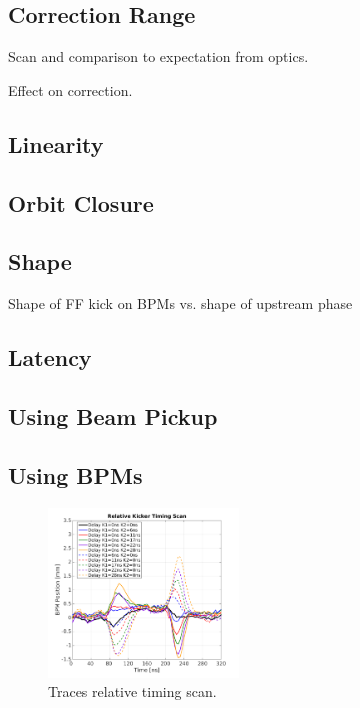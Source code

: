 


\subsection{Correction Range}
\label{ss:corrRange}


Scan and comparison to expectation from optics.

Effect on correction.

\subsection{Linearity}
\label{ss:kickLin}

\subsection{Orbit Closure}
\label{ss:orbitClosure}

\subsection{Shape}
\label{ss:kickShape}

Shape of FF kick on BPMs vs. shape of upstream phase


\subsection{Latency}
\label{ss:measLatency}

\subsection{Using Beam Pickup}
\label{ss:beamPickup}

\subsection{Using BPMs}
\label{ss:relativeBPM}


\begin{figure}
  \centering
  \includegraphics[width=0.45\textwidth]{Figures/relativeTimingScan_traces}
  \caption{Traces relative timing scan.}
  \label{f:relativeTimingScan_traces}
\end{figure}

